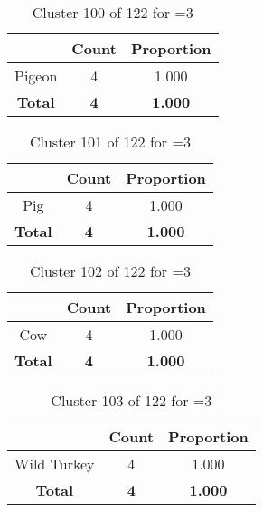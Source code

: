 \clearpage
\begin{table}[ht!]
\centering
\begin{tabular}{|c|c|c|}
\hline
\bf \Spec{} &\bf Count &\bf Proportion\\ \hline \hline
Pigeon & 4 & 1.000\\ \hline
\hline
\bf Total & \bf 4 & \bf 1.000\\ \hline
\end{tabular}
\label{tab:cluster:100:3}
\caption{Cluster 100 of 122 for \minneigh{}=3}
\end{table}

\begin{table}[ht!]
\centering
\begin{tabular}{|c|c|c|}
\hline
\bf \Spec{} &\bf Count &\bf Proportion\\ \hline \hline
Pig & 4 & 1.000\\ \hline
\hline
\bf Total & \bf 4 & \bf 1.000\\ \hline
\end{tabular}
\label{tab:cluster:101:3}
\caption{Cluster 101 of 122 for \minneigh{}=3}
\end{table}

\begin{table}[ht!]
\centering
\begin{tabular}{|c|c|c|}
\hline
\bf \Spec{} &\bf Count &\bf Proportion\\ \hline \hline
Cow & 4 & 1.000\\ \hline
\hline
\bf Total & \bf 4 & \bf 1.000\\ \hline
\end{tabular}
\label{tab:cluster:102:3}
\caption{Cluster 102 of 122 for \minneigh{}=3}
\end{table}

\begin{table}[ht!]
\centering
\begin{tabular}{|c|c|c|}
\hline
\bf \Spec{} &\bf Count &\bf Proportion\\ \hline \hline
Wild Turkey & 4 & 1.000\\ \hline
\hline
\bf Total & \bf 4 & \bf 1.000\\ \hline
\end{tabular}
\label{tab:cluster:103:3}
\caption{Cluster 103 of 122 for \minneigh{}=3}
\end{table}

